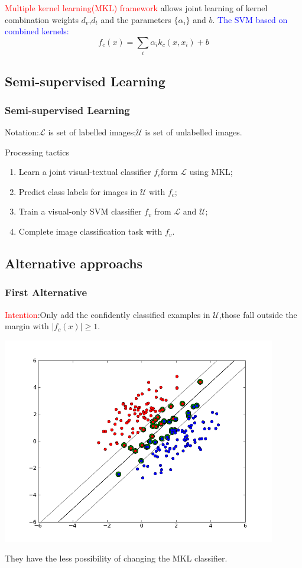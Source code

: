 \documentclass{beamer}
\begin{document}
\begin{CJK*}{UTF8}{gbsn}
\begin{frame}
\textcolor{red}{Multiple kernel learning(MKL) framework} allows joint learning of kernel combination weights $d_v$,$d_t$ and the parameters $\{\alpha_i\}$ and $b$.
\textcolor{blue}{The SVM based on combined kernels:}
\begin{equation}
f_c(x)=\sum_i\alpha_ik_c(x,x_i)+b
\end{equation}
\end{frame}

\subsection{Semi-supervised Learning}
\begin{frame}[allowframebreaks]\frametitle{Semi-supervised Learning}
Notation:$\mathcal{L}$ is set of labelled images;$\mathcal{U}$ is set of unlabelled images.\\
\begin{block}{Processing tactics}
\begin{enumerate}
\item Learn a joint visual-textual classifier $f_c$form $\mathcal{L}$ using MKL;
\item Predict class labels for images in $\mathcal{U}$ with $f_c$;
\item Train a visual-only SVM classifier $f_v$ from $\mathcal{L}$ and $\mathcal{U}$;
\item Complete image classification task with $f_v$.
\end{enumerate}
\end{block}
\end{frame}

\subsection{Alternative approachs}
\begin{frame}\frametitle{First Alternative}
\textcolor{red}{Intention}:Only add the confidently classified examples in $\mathcal{U}$,those fall outside the margin with $|f_c(x)|\geq 1$.\\
\begin{center}
\includegraphics[scale=0.4]{images/svm_soft}
\end{center}
They have the less possibility of changing the MKL classifier.
\end{frame}


\end{CJK*}
\end{document}

